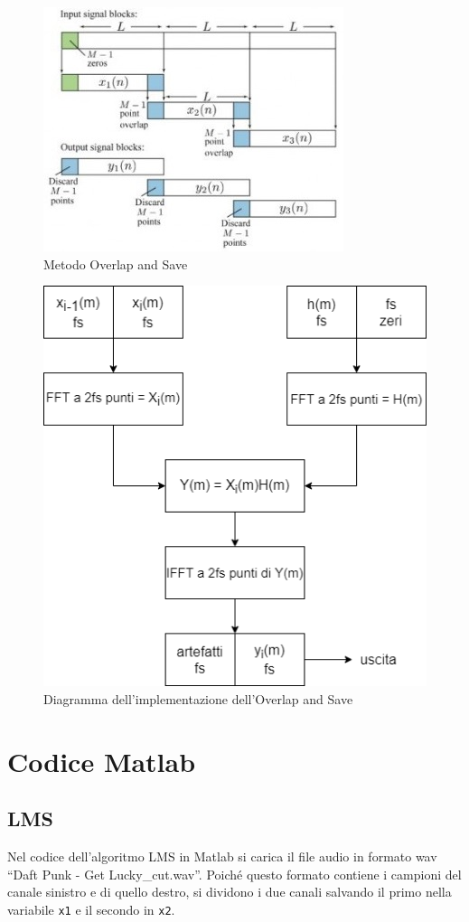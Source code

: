 \documentclass[12pt,a4paper,titlepage]{article}
\begin{document}
\begin{figure}[h]
	\centering	
	\includegraphics[width=.5\textwidth]{Immagini/ols}
	\caption{Metodo Overlap and Save}
	\label{fig:ols}
\end{figure}

\begin{figure}[h]
	\centering	
	\includegraphics[width=.5\textwidth]{Immagini/ols_diagram}
	\caption{Diagramma dell'implementazione dell'Overlap and Save}
	\label{fig:ols_digramma}
\end{figure}

\clearpage

\section{Codice Matlab}
\label{sec:codice_matlab}
\subsection{LMS}
\label{subsec:codice_matlab_lms}
Nel codice dell'algoritmo LMS in Matlab si carica il file audio in formato wav ``Daft Punk - Get Lucky\_cut.wav''. Poiché questo formato contiene i campioni del canale sinistro e di quello destro, si dividono i due canali salvando il primo nella variabile \texttt{x1} e il secondo in \texttt{x2}.
\end{document}
